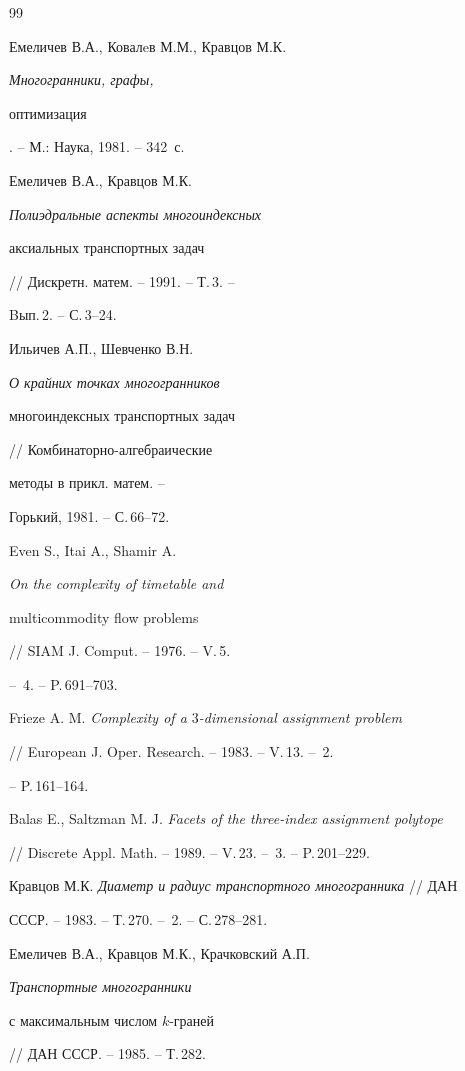 \begin{thebibliography}{99}







Емеличев В.А., Ковалeв М.М., Кравцов М.К. {\em Многогранники, графы,


оптимизация}. -- М.: Наука, 1981. -- 342~с.




Емеличев В.А., Кравцов М.К. {\em Полиэдральные аспекты многоиндексных


аксиальных транспортных задач} // Дискретн. матем. -- 1991. -- Т.\,3. --


Bып.\,2. -- С.\,3--24.




Ильичев А.П., Шевченко В.Н. {\em О крайних точках многогранников


многоиндексных транспортных задач} // Комбинаторно-алгебраические


методы в прикл. матем. --


Горький, 1981. -- С.\,66--72.




Even S., Itai A., Shamir A. {\em On the complexity of timetable and


multicommodity flow problems} // SIAM J. Comput. -- 1976. -- V.\,5.


-- \No\,4. -- P.\,691--703.




Frieze A. M. {\em Complexity of a $3$-dimensional assignment problem}


// European J. Oper. Research. -- 1983. -- V.\,13. -- \No\,2.


-- P.\,161--164.




Balas E., Saltzman M. J. {\em Facets of the three-index assignment polytope}


// Discrete Appl. Math. -- 1989. -- V.\,23. -- \No\,3. -- P.\,201--229.




Кравцов М.К. {\em Диаметр и радиус транспортного многогранника} // ДАН


СССР. -- 1983. -- Т.\,270. -- \No\,2. -- С.\,278--281.




Емеличев В.А., Кравцов М.К., Крачковский А.П. {\em Транспортные многогранники


с максимальным числом $k$-граней} // ДАН СССР. -- 1985. -- Т.\,282.



\end{thebibliography}

